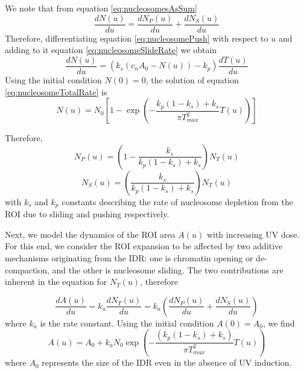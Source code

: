 \documentclass[12pt]{article}
\begin{document}
	We note that from equation \eqref{eq:nucleosomesAsSum}
	\begin{equation}
	\frac{dN(u)}{du}=\frac{dN_P(u)}{du} +\frac{dN_S(u)}{du}
	\end{equation}
	Therefore, differentiating equation \eqref{eq:nucleosomePush} with respect to $u$ and adding to it equation \eqref{eq:nucleosomeSlideRate} we obtain 
	\begin{equation}\label{eq:nucleosomeTotalRate}
	\frac{dN(u)}{du}= \left(k_s(c_nA_0-N(u))-k_p\right)\frac{dT(u)}{du}
	\end{equation}
	 Using the initial condition $N(0) = 0$, the solution of equation \eqref{eq:nucleosomeTotalRate} is 
	\begin{equation}\label{eq:totalNucleosomeLossIDR}
	N(u) = N_0\left[1-\exp\left(-\frac{k_p(1-k_s)+k_s}{\pi T_{max}^2}T(u)\right)\right]
	\end{equation}
	
	Therefore, 
	\begin{equation}
	N_P(u) = \left(1-\frac{k_s}{k_p(1-k_s)+k_s}\right)N_T(u)
	\end{equation}
	\begin{equation}\label{eq:nucleosomeSlide}
	N_S(u) = \left(\frac{k_s}{k_p(1-k_s)+k_s}\right)N_T(u)
	\end{equation}
	with $k_s$ and $k_p$ constants describing the rate of nucleosome depletion from
	the ROI due to sliding and pushing respectively.
	
	Next, we model the dynamics of the ROI area $A(u)$ with increasing UV
	dose. For this end, we consider the ROI expansion to be affected by two
	additive mechanisms originating from the IDR: one is chromatin opening or
	de-compaction, and the other is nucleosome sliding. The two contributions
	are inherent in the equation for $N_T(u)$, therefore
	
	\begin{equation*}
	\frac{dA(u)}{du}=k_a\frac{dN_T(u)}{du}=k_a\left(\frac{dN_P(u)}{du}+\frac{dN_S(u)}{du}\right)
	\end{equation*}
	where $k_a$ is the rate constant. Using the initial condition $A(0) = A_0$, we find
	\begin{equation}\label{eq:areaROI}
	A(u) = A_0+ k_aN_0\exp\left(-\frac{(k_p(1-k_s)+k_s)}{\pi T_{max}^2}T(u)\right)
	\end{equation}
	where $A_0$ represents the size of the IDR even in the absence of UV induction.
	
\end{document}
